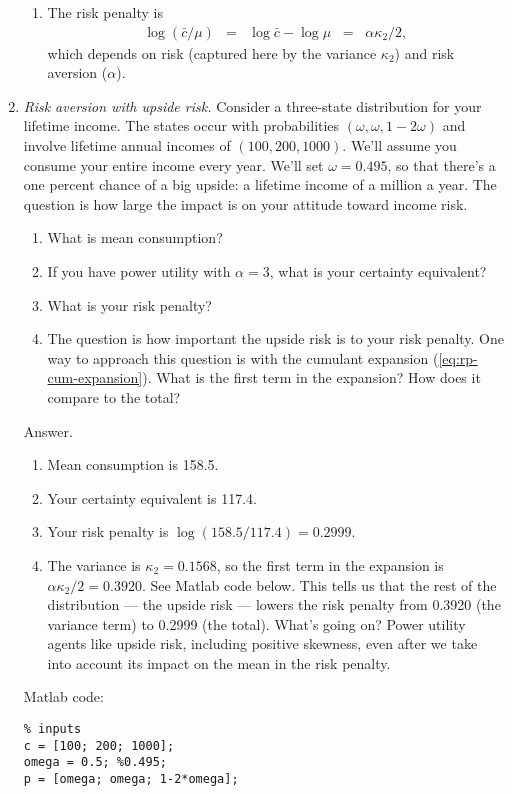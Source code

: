 \begin{enumerate}
\begin{enumerate}
\item The risk penalty is
\begin{eqnarray*}
    \log (\bar{c}/\mu) &=& \log \bar{c} - \log \mu \;\;=\;\; \alpha\kappa_2/2 ,
\end{eqnarray*}
which depends on risk (captured here by the variance $\kappa_2$)
and risk aversion ($\alpha$).
\end{enumerate}


\item {\it Risk aversion with upside risk.\/}
Consider a three-state distribution for your lifetime income.
The states occur with probabilities $(\omega, \omega, 1-2\omega)$
and involve lifetime annual incomes of $(100, 200, 1000)$.
We'll assume you consume your entire income every year.
We'll set $\omega = 0.495$, so that there's a one percent chance
of a big upside:  a lifetime income of a million a year.
The question is how large the impact is on your attitude toward income risk.
%
\begin{enumerate}
\item What is mean consumption?
\item If you have power utility with $\alpha = 3$, what is your certainty equivalent?
\item What is your risk penalty?
\item The question is how important the upside risk is to your risk penalty.
One way to approach this question is with the cumulant expansion
(\ref{eq:rp-cum-expansion}).
What is the first term in the expansion?
How does it compare to the total?
\end{enumerate}
%
Answer.
\begin{enumerate}
\item Mean consumption is 158.5.
\item Your certainty equivalent is 117.4.
\item Your risk penalty is $ \log (158.5/117.4) = 0.2999$.
\item The variance is $\kappa_2 = 0.1568$, so the first term
in the expansion is $\alpha \kappa_2 / 2 = 0.3920$.
See Matlab code below.
This tells us that the rest of the distribution --- the upside risk ---
lowers the risk penalty from 0.3920 (the variance term) to 0.2999 (the total).
What's going on?
Power utility agents like upside risk, including positive skewness,
even after we take into account its impact on the mean in the risk penalty.
\end{enumerate}

Matlab code:
\begin{verbatim}
% inputs
c = [100; 200; 1000];
omega = 0.5; %0.495;
p = [omega; omega; 1-2*omega];


\end{verbatim}
\end{enumerate}
